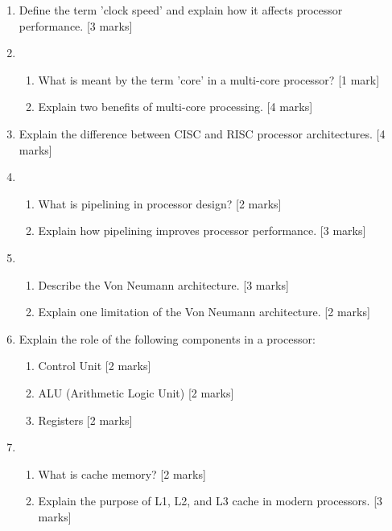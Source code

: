 \documentclass{article}
\begin{document}
\begin{enumerate}

\item Define the term 'clock speed' and explain how it affects processor performance. [3 marks]

\item 
\begin{enumerate}[label=(\alph*)]
    \item What is meant by the term 'core' in a multi-core processor? [1 mark]
    \item Explain two benefits of multi-core processing. [4 marks]
\end{enumerate}

\item Explain the difference between CISC and RISC processor architectures. [4 marks]

\item 
\begin{enumerate}[label=(\alph*)]
    \item What is pipelining in processor design? [2 marks]
    \item Explain how pipelining improves processor performance. [3 marks]
\end{enumerate}

\item 
\begin{enumerate}[label=(\alph*)]
    \item Describe the Von Neumann architecture. [3 marks]
    \item Explain one limitation of the Von Neumann architecture. [2 marks]
\end{enumerate}

\item Explain the role of the following components in a processor:
\begin{enumerate}[label=(\alph*)]
    \item Control Unit [2 marks]
    \item ALU (Arithmetic Logic Unit) [2 marks]
    \item Registers [2 marks]
\end{enumerate}

\item 
\begin{enumerate}[label=(\alph*)]
    \item What is cache memory? [2 marks]
    \item Explain the purpose of L1, L2, and L3 cache in modern processors. [3 marks]
\end{enumerate}


\end{enumerate}
\end{document}
